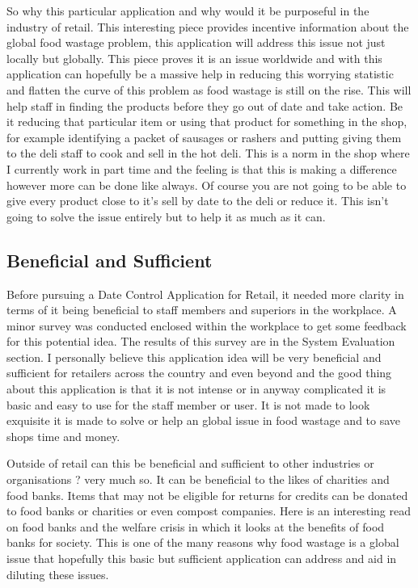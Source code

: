 So why this particular application and why would it be purposeful in the industry of retail. This interesting piece \cite{gustavsson2011global} provides incentive information about the global food wastage problem, this application will address this issue not just locally but globally. This piece proves it is an issue worldwide and with this application can hopefully be a massive help in reducing this worrying statistic and flatten the curve of this problem as food wastage is still on the rise. This will help staff in finding the products before they go out of date and take action. Be it reducing that particular item or using that product for something in the shop, for example identifying a packet of sausages or rashers and putting giving them to the deli staff to cook and sell in the hot deli. This is a norm in the shop where I currently work in part time and the feeling is that this is making a difference however more can be done like always. Of course you are not going to be able to give every product close to it's sell by date to the deli or reduce it. This isn't going to solve the issue entirely but to help it as much as it can. 

\subsection{Beneficial and Sufficient}
Before pursuing a Date Control Application for Retail, it needed more clarity in terms of it being beneficial to staff members and superiors in the workplace. A minor survey was conducted enclosed within the workplace to get some feedback for this potential idea. The results of this survey are in the System Evaluation section. I personally believe this application idea will be very beneficial and sufficient for retailers across the country and even beyond and the good thing about this application is that it is not intense or in anyway complicated it is basic and easy to use for the staff member or user. It is not made to look exquisite it is made to solve or help an global issue in food wastage and to save shops time and money.
\newline

Outside of retail can this be beneficial and sufficient to other industries or organisations ? very much so. It can be beneficial to the likes of charities and food banks. Items that may not be eligible for returns for credits can be donated to food banks or charities or even compost companies. \cite{riches1986food} Here is an interesting read on food banks and the welfare crisis in which it looks at the benefits of food banks for society. This is one of the many reasons why food wastage is a global issue that hopefully this basic but sufficient application can address and aid in diluting these issues. 
\newline

